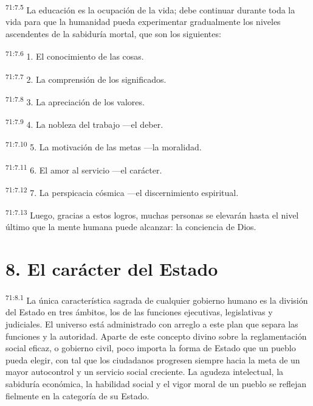 \par
\textsuperscript{71:7.5} La educación es la ocupación de la vida; debe continuar durante toda la vida para que la humanidad pueda experimentar gradualmente los niveles ascendentes de la sabiduría mortal, que son los siguientes:

\par
\textsuperscript{71:7.6} 1. El conocimiento de las cosas.

\par
\textsuperscript{71:7.7} 2. La comprensión de los significados.

\par
\textsuperscript{71:7.8} 3. La apreciación de los valores.

\par
\textsuperscript{71:7.9} 4. La nobleza del trabajo ---el deber.

\par
\textsuperscript{71:7.10} 5. La motivación de las metas ---la moralidad.

\par
\textsuperscript{71:7.11} 6. El amor al servicio ---el carácter.

\par
\textsuperscript{71:7.12} 7. La perspicacia cósmica ---el discernimiento espiritual.

\par
\textsuperscript{71:7.13} Luego, gracias a estos logros, muchas personas se elevarán hasta el nivel último que la mente humana puede alcanzar: la conciencia de Dios.

\section*{8. El carácter del Estado}
\par
\textsuperscript{71:8.1} La única característica sagrada de cualquier gobierno humano es la división del Estado en tres ámbitos, los de las funciones ejecutivas, legislativas y judiciales. El universo está administrado con arreglo a este plan que separa las funciones y la autoridad. Aparte de este concepto divino sobre la reglamentación social eficaz, o gobierno civil, poco importa la forma de Estado que un pueblo pueda elegir, con tal que los ciudadanos progresen siempre hacia la meta de un mayor autocontrol y un servicio social creciente. La agudeza intelectual, la sabiduría económica, la habilidad social y el vigor moral de un pueblo se reflejan fielmente en la categoría de su Estado.

